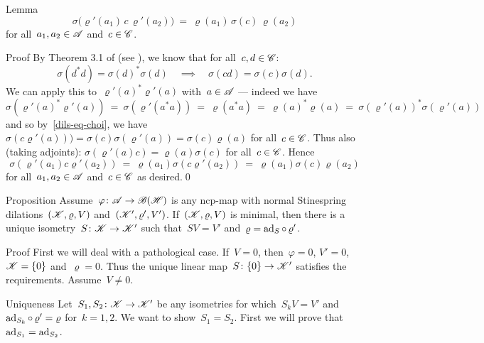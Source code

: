 \begin{parsec}
\begin{point}{Lemma}
\begin{equation*}
\sigma\bigl(\varrho'(a_1)\,c\, \varrho'(a_2)\bigr) \ =\   \varrho(a_1) \,\sigma(c) \,\varrho(a_2)
\end{equation*}
    for all~$a_1,a_2 \in \mathscr{A}$ and~$c \in \mathscr{C}$.
\begin{point}{Proof}%
By Theorem 3.1 of \cite{choi} (see ),
we know that for all~$c,d\in\mathscr{C}$:
\begin{equation}
    \sigma(d^*d) = \sigma(d)^*\sigma(d) \quad \implies \quad
    \sigma(cd) = \sigma(c)\sigma(d).\label{dils-eq-choi}
\end{equation}
We can apply this to~$\varrho'(a)^*\varrho'(a)$
with~$a \in \mathscr{A}$ --- indeed we have
\begin{equation*}
\sigma(\varrho'(a)^* \varrho'(a))
  \   =\ \sigma(\varrho'(a^*a))
  \  =\ \varrho(a^*a)
  \  =\ \varrho(a)^*\varrho(a)
  \  =\ \sigma(\varrho'(a))^*\sigma(\varrho'(a))
\end{equation*}
and so by~\eqref{dils-eq-choi},
    we have~$\sigma(c\varrho'(a)))
        = \sigma(c)\sigma(\varrho'(a)) = \sigma(c)\varrho(a)$
        for all~$c \in \mathscr{C}$.
Thus also (taking adjoints):
$\sigma(\varrho'(a)c) = \varrho(a)\sigma(c)$ for all~$c \in \mathscr{C}$.
Hence
\begin{equation*}
\sigma(\varrho'(a_1)c\varrho'(a_2))
            \ =\  \varrho(a_1)\sigma(c \varrho'(a_2))
            \ =\  \varrho(a_1) \sigma(c) \varrho(a_2)
\end{equation*}
    for all~$a_1,a_2 \in \mathscr{A}$ and~$c\in \mathscr{C}$ as desired.\qed
\end{point}
\end{point}
\begin{point}{Proposition}%
    Assume~$\varphi\colon \mathscr{A} \to \mathscr{B}(\mathscr{H})$
        is any ncp-map with normal
        Stinespring dilations~$(\mathscr{K}, \varrho, V)$
    and~$(\mathscr{K}', \varrho', V')$.
        If~$(\mathscr{K},\varrho,V)$ is minimal,
        then there is a unique isometry~$S\colon \mathscr{K} \to \mathscr{K}'$
        such that~$SV=V'$ and~$\varrho = \mathrm{ad}_S\mathop{\circ} \varrho'$.
\begin{point}{Proof}
First we will deal with a pathological case.
If~$V = 0$, then~$\varphi = 0$, $V' = 0$, $\mathscr{K} = \{0\}$
and~$\varrho = 0$.  Thus the unique linear map~$S\colon \{0\} \to \mathscr{K}'$
satisfies the requirements.  Assume~$V \neq 0$.
\begin{point}{Uniqueness}%
Let~$S_1,S_2\colon \mathscr{K} \to \mathscr{K}'$
be any isometries for which~$S_k V = V'$ and~$\mathrm{ad}_{S_k} \mathop{\circ} \varrho' = \varrho$
for~$k =1,2$.
We want to show~$S_1=S_2$.
First we will prove that~$\mathrm{ad}_{S_1} = \mathrm{ad}_{S_2}$.

\end{point}
\end{point}
\end{point}
\end{parsec}
